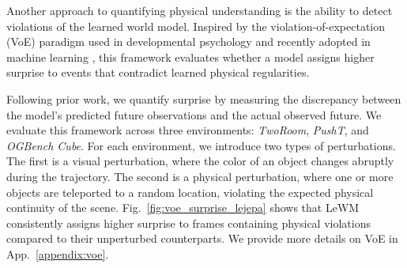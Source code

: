 Another approach to quantifying physical understanding is the ability to detect violations of the learned world model. Inspired by the violation-of-expectation (VoE) paradigm used in developmental psychology and recently adopted in machine learning \cite{margoni2024violation, garrido2025intuitive, bordes2025intphys2}, this framework evaluates whether a model assigns higher surprise to events that contradict learned physical regularities.


Following prior work, we quantify surprise by measuring the discrepancy between the model’s predicted future observations and the actual observed future. We evaluate this framework across three environments: \textit{TwoRoom}, \textit{PushT}, and \textit{OGBench Cube}. For each environment, we introduce two types of perturbations. The first is a visual perturbation, where the color of an object changes abruptly during the trajectory. The second is a physical perturbation, where one or more objects are teleported to a random location, violating the expected physical continuity of the scene.  Fig.~\ref{fig:voe_surprise_lejepa} shows that LeWM consistently assigns higher surprise to frames containing physical violations compared to their unperturbed counterparts. We provide more details on VoE in App.~\ref{appendix:voe}.
